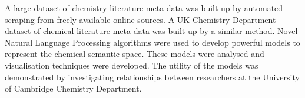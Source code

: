 A large dataset of chemistry literature meta-data was built up by automated scraping from freely-available online sources. A UK Chemistry Department dataset of chemical literature meta-data was built up by a similar method. Novel Natural Language Processing algorithms were used to develop powerful models to represent the chemical semantic space. These models were analysed and visualisation techniques were developed. The utility of the models was demonstrated by investigating relationships between researchers at the University of Cambridge Chemistry Department. 